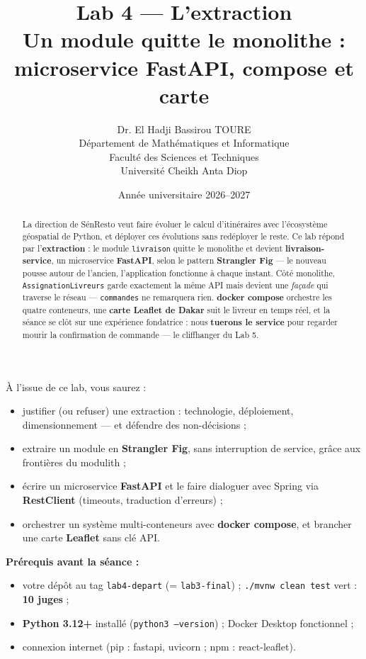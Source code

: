 \documentclass[a4paper,11pt]{article}
\title{\textcolor{titlecolor}{\Huge\textbf{Lab 4 --- L'extraction}}\\[0.5em]
       \textcolor{sectitlecolor}{\LARGE Un module quitte le monolithe : microservice FastAPI, compose et carte}}
\author{Dr. El Hadji Bassirou TOURE\\
        Département de Mathématiques et Informatique\\
        Faculté des Sciences et Techniques\\
        Université Cheikh Anta Diop}
\date{Année universitaire 2026--2027}
\begin{document}
\maketitle
\thispagestyle{empty}

\begin{abstract}
\noindent La direction de SénResto veut faire évoluer le calcul d'itinéraires
avec l'écosystème géospatial de Python, et déployer ces évolutions sans
redéployer le reste. Ce lab répond par l'\textbf{extraction} : le module
\texttt{livraison} quitte le monolithe et devient \textbf{livraison-service},
un microservice \textbf{FastAPI}, selon le pattern \textbf{Strangler Fig} ---
le nouveau pousse autour de l'ancien, l'application fonctionne à chaque
instant. Côté monolithe, \texttt{AssignationLivreurs} garde exactement la
même API mais devient une \emph{façade} qui traverse le réseau ---
\texttt{commandes} ne remarquera rien. \textbf{docker compose} orchestre les
quatre conteneurs, une \textbf{carte Leaflet de Dakar} suit le livreur en
temps réel, et la séance se clôt sur une expérience fondatrice : nous
\textbf{tuerons le service} pour regarder mourir la confirmation de commande
--- le cliffhanger du Lab 5.
\end{abstract}

\begin{benefitbox}
À l'issue de ce lab, vous saurez :
\begin{itemize}[nosep]
  \item justifier (ou refuser) une extraction : technologie, déploiement,
        dimensionnement --- et défendre des non-décisions ;
  \item extraire un module en \textbf{Strangler Fig}, sans interruption de
        service, grâce aux frontières du modulith ;
  \item écrire un microservice \textbf{FastAPI} et le faire dialoguer avec
        Spring via \textbf{RestClient} (timeouts, traduction d'erreurs) ;
  \item orchestrer un système multi-conteneurs avec \textbf{docker compose},
        et brancher une carte \textbf{Leaflet} sans clé API.
\end{itemize}
\end{benefitbox}

\begin{warningbox}
\textbf{Prérequis avant la séance :}
\begin{itemize}[nosep]
  \item votre dépôt au tag \texttt{lab4-depart} (= \texttt{lab3-final}) ;
        \texttt{./mvnw clean test} vert : \textbf{10 juges} ;
  \item \textbf{Python 3.12+} installé (\texttt{python3 --version}) ;
        Docker Desktop fonctionnel ;
  \item connexion internet (pip : fastapi, uvicorn ; npm : react-leaflet).
\end{itemize}
\end{warningbox}
\end{document}
